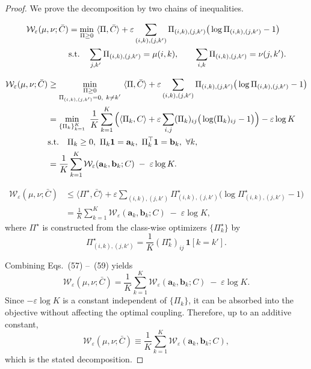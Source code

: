 \documentclass[journal,twoside,web]{ieeecolor}
\begin{document}
\begin{proof}
We prove the decomposition by two chains of inequalities.

\begin{align}
\mathcal{W}_{\varepsilon}(\mu,\nu;\bar C)
&=
\min_{\Pi\ge 0}\ \langle \Pi,\bar C\rangle
+\varepsilon\sum_{(i,k),(j,k')} \Pi_{(i,k),(j,k')}\big(\log \Pi_{(i,k),(j,k')}-1\big)
\label{eq:bd0}\\
&\text{s.t.}\quad
\sum_{j,k'} \Pi_{(i,k),(j,k')}=\mu(i,k),\qquad
\sum_{i,k} \Pi_{(i,k),(j,k')}=\nu(j,k').
\notag
\end{align}

\begin{align}
\mathcal{W}_{\varepsilon}(\mu,\nu;\bar C)
&\ge
\min_{\substack{\Pi\ge 0\\ \Pi_{(i,k),(j,k')}=0,\ k\neq k'}}\ 
\langle \Pi,\bar C\rangle
+\varepsilon\sum_{(i,k),(j,k')} \Pi_{(i,k),(j,k')}\big(\log \Pi_{(i,k),(j,k')}-1\big)
\label{eq:bd1}\\
&=
\min_{\{\Pi_k\}_{k=1}^{K}}\ 
\frac{1}{K}\sum_{k=1}^{K}
\Big(
\langle \Pi_k,C\rangle
+\varepsilon\sum_{i,j}(\Pi_k)_{ij}\big(\log (\Pi_k)_{ij}-1\big)
\Big)
-\varepsilon\log K
\label{eq:bd2}\\
&\text{s.t.}\quad
\Pi_k\ge 0,\ \Pi_k\mathbf{1}=\mathbf{a}_k,\ \Pi_k^\top\mathbf{1}=\mathbf{b}_k,\ \forall k,
\notag\\
&=
\frac{1}{K}\sum_{k=1}^{K}\mathcal{W}_{\varepsilon}(\mathbf{a}_k,\mathbf{b}_k;C)\;-\;\varepsilon\log K.
\label{eq:bd3}
\end{align}

\begin{align}
\mathcal{W}_{\varepsilon}(\mu,\nu;\bar C)
&\le
\langle \Pi^\star,\bar C\rangle
+\varepsilon\sum_{(i,k),(j,k')} \Pi^\star_{(i,k),(j,k')}\big(\log \Pi^\star_{(i,k),(j,k')}-1\big)
\label{eq:bd4}\\
&=
\frac{1}{K}\sum_{k=1}^{K}\mathcal{W}_{\varepsilon}(\mathbf{a}_k,\mathbf{b}_k;C)\;-\;\varepsilon\log K,
\label{eq:bd5}
\end{align}
where $\Pi^\star$ is constructed from the class-wise optimizers $\{\Pi_k^\star\}$ by
\[
\Pi^\star_{(i,k),(j,k')}=\frac{1}{K}(\Pi_k^\star)_{ij}\,\mathbf{1}[k=k'].
\]

Combining Eqs.~(57) --~(59) yields
\begin{equation} 
\mathcal{W}_{\varepsilon}(\mu,\nu;\bar C)
=
\frac{1}{K}\sum_{k=1}^{K}\mathcal{W}_{\varepsilon}(\mathbf{a}_k,\mathbf{b}_k;C)\;-\;\varepsilon\log K.
\end{equation}
Since $-\varepsilon\log K$ is a constant independent of $\{\Pi_k\}$, it can be absorbed into the objective without affecting the optimal coupling. Therefore, up to an additive constant,
\begin{equation}
\mathcal{W}_{\varepsilon}(\mu,\nu;\bar C)
\equiv
\frac{1}{K}\sum_{k=1}^{K}\mathcal{W}_{\varepsilon}(\mathbf{a}_k,\mathbf{b}_k;C),
\end{equation}
which is the stated decomposition.
\end{proof}
\end{document}
